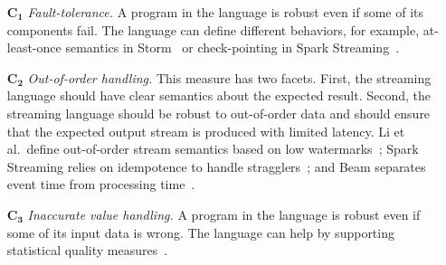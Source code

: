 \begin{itemize}[leftmargin=6mm]
  \item[$\mathbf{C_1}$] \emph{Fault-tolerance.} A program in the
    language is robust even if some of its components fail. The
    language can define different behaviors, for example,
    at-least-once semantics in Storm~\cite{toshniwal_et_al_2014}
    or check-pointing in Spark Streaming~\cite{zaharia_et_al_2013}.
  \item[$\mathbf{C_2}$] \emph{Out-of-order handling.} This measure has
    two facets. First, the streaming language should have clear
    semantics about the expected result. Second, the streaming language should be
    robust to out-of-order data and should ensure that the expected
    output stream is produced with limited latency. Li et al.\ define
    out-of-order stream semantics based on low
    watermarks~\cite{Li:2008:OPN:1453856.1453890}; Spark Streaming
    relies on idempotence to handle stragglers~\cite{zaharia_et_al_2013}; and Beam separates
    event time from processing time~\cite{akidau_et_al_2015}.
  \item[$\mathbf{C_3}$] \emph{Inaccurate value handling.} A program in
    the language is robust even if some of its input data is wrong.
    The language can help by supporting statistical quality
    measures~\cite{wasserkrug_et_al_2008}.
\end{itemize}

